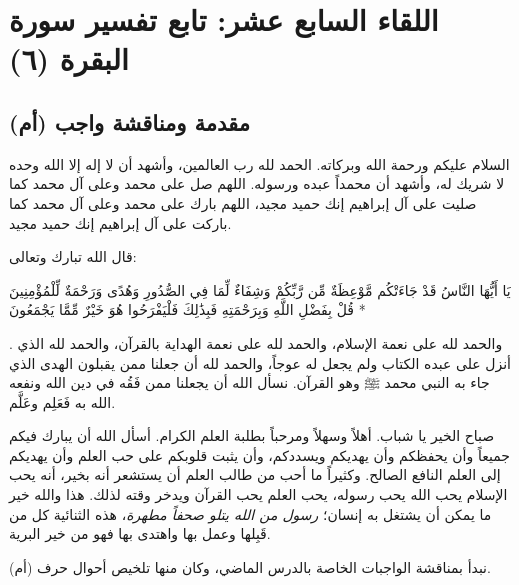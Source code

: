 \chapter{اللقاء السابع عشر: تابع تفسير سورة البقرة (٦)}

\section{مقدمة ومناقشة واجب (أم)}
السلام عليكم ورحمة الله وبركاته. الحمد لله رب العالمين، وأشهد أن لا إله إلا الله وحده لا شريك له، وأشهد أن محمداً عبده ورسوله. اللهم صل على محمد وعلى آل محمد كما صليت على آل إبراهيم إنك حميد مجيد، اللهم بارك على محمد وعلى آل محمد كما باركت على آل إبراهيم إنك حميد مجيد.

قال الله تبارك وتعالى: \begin{ayah}يَا أَيُّهَا النَّاسُ قَدْ جَاءَتْكُم مَّوْعِظَةٌ مِّن رَّبِّكُمْ وَشِفَاءٌ لِّمَا فِي الصُّدُورِ وَهُدًى وَرَحْمَةٌ لِّلْمُؤْمِنِينَ * قُلْ بِفَضْلِ اللَّهِ وَبِرَحْمَتِهِ فَبِذَٰلِكَ فَلْيَفْرَحُوا هُوَ خَيْرٌ مِّمَّا يَجْمَعُونَ\end{ayah}. والحمد لله على نعمة الإسلام، والحمد لله على نعمة الهداية بالقرآن، والحمد لله الذي أنزل على عبده الكتاب ولم يجعل له عوجاً، والحمد لله أن جعلنا ممن يقبلون الهدى الذي جاء به النبي محمد ﷺ وهو القرآن. نسأل الله أن يجعلنا ممن فَقُه في دين الله ونفعه الله به فَعَلِم وعَلَّم.

صباح الخير يا شباب. أهلاً وسهلاً ومرحباً بطلبة العلم الكرام. أسأل الله أن يبارك فيكم جميعاً وأن يحفظكم وأن يهديكم ويسددكم، وأن يثبت قلوبكم على حب العلم وأن يهديكم إلى العلم النافع الصالح. وكثيراً ما أحب من طالب العلم أن يستشعر أنه بخير، أنه يحب الإسلام يحب الله يحب رسوله، يحب العلم يحب القرآن ويدخر وقته لذلك. هذا والله خير ما يمكن أن يشتغل به إنسان؛ \textit{رسول من الله يتلو صحفاً مطهرة}، هذه الثنائية كل من قَبِلها وعمل بها واهتدى بها فهو من خير البرية.

نبدأ بمناقشة الواجبات الخاصة بالدرس الماضي، وكان منها تلخيص أحوال حرف (أم).

